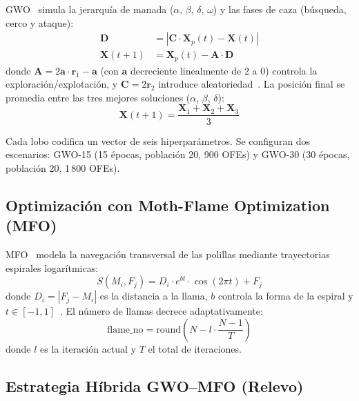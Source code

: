 \documentclass[journal]{IEEEtran}
\begin{document}
GWO~\cite{mirjalili2014} simula la jerarquía de manada ($\alpha$, $\beta$, $\delta$, $\omega$) y las fases de caza (búsqueda, cerco y ataque):
\begin{align}
    \mathbf{D} &= |\mathbf{C} \cdot \mathbf{X}_p(t) - \mathbf{X}(t)| \label{eq:gwo1} \\
    \mathbf{X}(t+1) &= \mathbf{X}_p(t) - \mathbf{A} \cdot \mathbf{D} \label{eq:gwo2}
\end{align}
donde $\mathbf{A} = 2\mathbf{a} \cdot \mathbf{r}_1 - \mathbf{a}$ (con $\mathbf{a}$ decreciente linealmente de 2 a 0) controla la exploración/explotación, y $\mathbf{C} = 2\mathbf{r}_2$ introduce aleatoriedad~\cite{mirjalili2014}. La posición final se promedia entre las tres mejores soluciones ($\alpha$, $\beta$, $\delta$):
\begin{equation}
    \mathbf{X}(t+1) = \frac{\mathbf{X}_1 + \mathbf{X}_2 + \mathbf{X}_3}{3}
    \label{eq:gwo3}
\end{equation}

Cada lobo codifica un vector de seis hiperparámetros. Se configuran dos escenarios: GWO-15 (15 épocas, población 20, 900 OFEs) y GWO-30 (30 épocas, población 20, 1\,800 OFEs).

\subsection{Optimización con Moth-Flame Optimization (MFO)}
\label{sec:mfo}

MFO~\cite{mirjalili2015} modela la navegación transversal de las polillas mediante trayectorias espirales logarítmicas:
\begin{equation}
    S(M_i, F_j) = D_i \cdot e^{bt} \cdot \cos(2\pi t) + F_j
    \label{eq:mfo}
\end{equation}
donde $D_i = |F_j - M_i|$ es la distancia a la llama, $b$ controla la forma de la espiral y $t \in [-1, 1]$~\cite{mirjalili2015}. El número de llamas decrece adaptativamente:
\begin{equation}
    \text{flame\_no} = \text{round}\left(N - l \cdot \frac{N-1}{T}\right)
    \label{eq:flames}
\end{equation}
donde $l$ es la iteración actual y $T$ el total de iteraciones.

\subsection{Estrategia Híbrida GWO--MFO (Relevo)}
\label{sec:hybrid}
\end{document}

